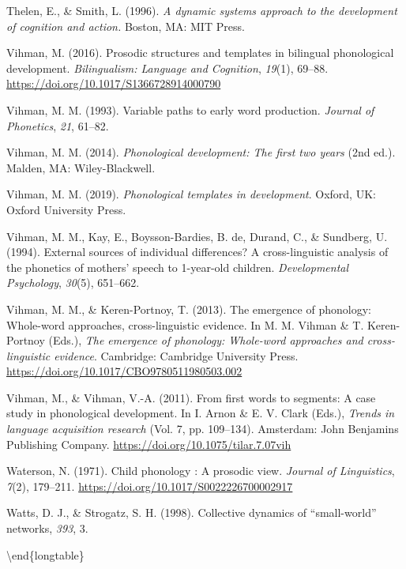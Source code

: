 \documentclass[
  english,
  man,floatsintext]{apa6}
\begin{document}
\leavevmode\hypertarget{ref-thelen_esther_dynamic_1996}{}%
Thelen, E., \& Smith, L. (1996). \emph{A dynamic systems approach to the development of cognition and action.} Boston, MA: MIT Press.

\leavevmode\hypertarget{ref-vihman_prosodic_2016}{}%
Vihman, M. (2016). Prosodic structures and templates in bilingual phonological development. \emph{Bilingualism: Language and Cognition}, \emph{19}(1), 69--88. \url{https://doi.org/10.1017/S1366728914000790}

\leavevmode\hypertarget{ref-vihman_variable_1993}{}%
Vihman, M. M. (1993). Variable paths to early word production. \emph{Journal of Phonetics}, \emph{21}, 61--82.

\leavevmode\hypertarget{ref-vihman_phonological_2014}{}%
Vihman, M. M. (2014). \emph{Phonological development: The first two years} (2nd ed.). Malden, MA: Wiley-Blackwell.

\leavevmode\hypertarget{ref-vihman_phonological_2019}{}%
Vihman, M. M. (2019). \emph{Phonological templates in development}. Oxford, UK: Oxford University Press.

\leavevmode\hypertarget{ref-vihman_external_1994}{}%
Vihman, M. M., Kay, E., Boysson-Bardies, B. de, Durand, C., \& Sundberg, U. (1994). External sources of individual differences? A cross-linguistic analysis of the phonetics of mothers' speech to 1-year-old children. \emph{Developmental Psychology}, \emph{30}(5), 651--662.

\leavevmode\hypertarget{ref-vihman_emergence_2013}{}%
Vihman, M. M., \& Keren-Portnoy, T. (2013). The emergence of phonology: Whole-word approaches, cross-linguistic evidence. In M. M. Vihman \& T. Keren-Portnoy (Eds.), \emph{The emergence of phonology: Whole-word approaches and cross-linguistic evidence}. Cambridge: Cambridge University Press. \url{https://doi.org/10.1017/CBO9780511980503.002}

\leavevmode\hypertarget{ref-arnon_first_2011}{}%
Vihman, M., \& Vihman, V.-A. (2011). From first words to segments: A case study in phonological development. In I. Arnon \& E. V. Clark (Eds.), \emph{Trends in language acquisition research} (Vol. 7, pp. 109--134). Amsterdam: John Benjamins Publishing Company. \url{https://doi.org/10.1075/tilar.7.07vih}

\leavevmode\hypertarget{ref-waterson_child_1971}{}%
Waterson, N. (1971). Child phonology : A prosodic view. \emph{Journal of Linguistics}, \emph{7}(2), 179--211. \url{https://doi.org/10.1017/S0022226700002917}

\leavevmode\hypertarget{ref-watts_collective_1998}{}%
Watts, D. J., \& Strogatz, S. H. (1998). Collective dynamics of ``small-world'' networks, \emph{393}, 3.

\textbackslash end\{longtable\}
\endgroup
\end{document}
